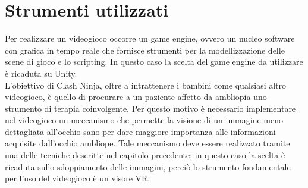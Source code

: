 \documentclass[12pt,a4paper,openright,twoside]{book}
\begin{document}
	\section[Strumenti]{Strumenti utilizzati}
	Per realizzare un videogioco occorre un game engine, ovvero un nucleo software con grafica in tempo reale che fornisce strumenti per la modellizzazione delle scene di gioco e lo scripting. In questo caso la scelta del game engine da utilizzare è ricaduta su Unity.\\
	L'obiettivo di Clash Ninja, oltre a intrattenere i bambini come qualsiasi altro videogioco, è quello di procurare a un paziente affetto da ambliopia uno strumento di terapia coinvolgente. Per questo motivo è necessario implementare nel videogioco un meccanismo che permette la visione di un immagine meno dettagliata all'occhio sano per dare maggiore importanza alle informazioni acquisite dall'occhio ambliope. Tale meccanismo deve essere realizzato tramite una delle tecniche descritte nel capitolo precedente; in questo caso la scelta è ricaduta sullo sdoppiamento delle immagini, perciò lo strumento fondamentale per l'uso del videogioco è un visore VR.
\end{document}
